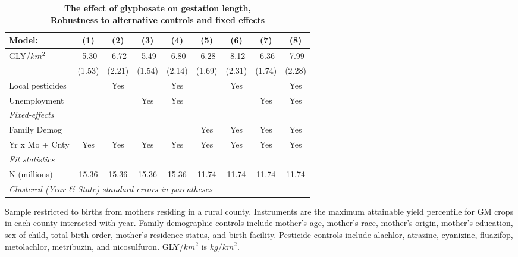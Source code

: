 \begin{table}[htbp]
   \centering
   \small
   \begin{threeparttable}[b]
      \caption{\label{tab:robust-cntrl-gestation-allyielddiffpercentilegmomax} \textbf{The effect of glyphosate on gestation length, \\ Robustness to alternative controls and fixed effects}}
      \begin{tabular}{lcccccccc}
         \toprule
         Model:           & (1)    & (2)    & (3)    & (4)    & (5)    & (6)    & (7)    & (8)\\  
         \midrule 
         GLY/$km^2$       & -5.30  & -6.72  & -5.49  & -6.80  & -6.28  & -8.12  & -6.36  & -7.99\\   
                          & (1.53) & (2.21) & (1.54) & (2.14) & (1.69) & (2.31) & (1.74) & (2.28)\\   
         Local pesticides &        & Yes    &        & Yes    &        & Yes    &        & Yes\\  
         Unemployment     &        &        & Yes    & Yes    &        &        & Yes    & Yes\\  
         \midrule
         \emph{Fixed-effects}\\
         Family Demog     &        &        &        &        & Yes    & Yes    & Yes    & Yes\\  
         Yr x Mo + Cnty   & Yes    & Yes    & Yes    & Yes    & Yes    & Yes    & Yes    & Yes\\  
         \midrule
         \emph{Fit statistics}\\
         N (millions)     & 15.36  & 15.36  & 15.36  & 15.36  & 11.74  & 11.74  & 11.74  & 11.74\\  
         \midrule
         \multicolumn{9}{l}{\emph{Clustered (Year \& State) standard-errors in parentheses}}\\
      \end{tabular}
      
      \begin{tablenotes}\item Sample restricted to births from mothers residing in a rural county. Instruments are the maximum attainable yield percentile for GM crops in each county interacted with year. Family demographic controls include mother's age, mother's race, mother's origin, mother's education, sex of child, total birth order, mother's residence status, and birth facility. Pesticide controls include alachlor, atrazine, cyanizine, fluazifop, metolachlor, metribuzin, and nicosulfuron. GLY/$km^2$ is $kg/km^2$.
      \end{tablenotes}
   \end{threeparttable}
\end{table}

